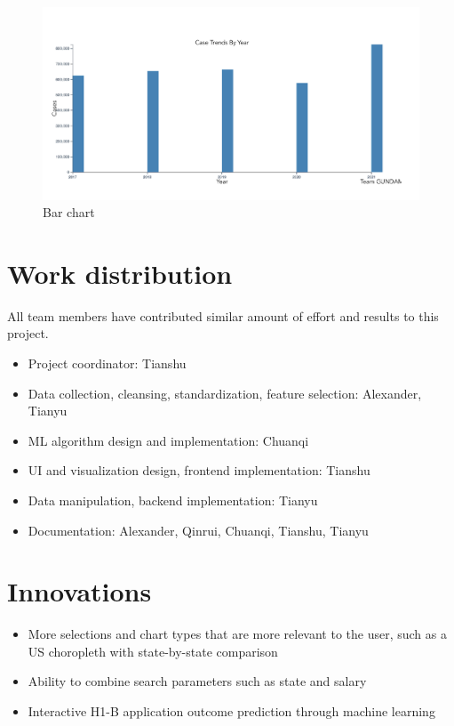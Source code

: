 \documentclass[sigconf]{acmart}
\begin{document}
\begin{figure}
  \includegraphics[width=\linewidth]{fig3.png}
  \caption{Bar chart}
  \label{fig:barchart}
\end{figure}


\appendix

\section{Work distribution}
All team members have contributed similar amount of effort and results to this project.

\begin{itemize}
	\item Project coordinator: Tianshu
	\item Data collection, cleansing, standardization, feature selection: Alexander, Tianyu
	\item ML algorithm design and implementation: Chuanqi 
	\item UI and visualization design, frontend implementation: Tianshu
	\item Data manipulation, backend implementation: Tianyu
	\item Documentation: Alexander, Qinrui, Chuanqi, Tianshu, Tianyu
	
\end{itemize}


\section{Innovations}
\begin{itemize}
	\item More selections and chart types that are more relevant to the user, such as a US choropleth with state-by-state comparison
	\item Ability to combine search parameters such as state and salary
	\item Interactive H1-B application outcome prediction through machine learning

\end{itemize}
\end{document}
